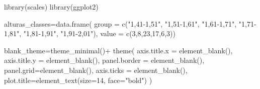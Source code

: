\documentclass[
]{book}
\newenvironment{Shaded}{\begin{snugshade}}{\end{snugshade}}
\newcommand{\AttributeTok}[1]{\textcolor[rgb]{0.77,0.63,0.00}{#1}}
\newcommand{\DecValTok}[1]{\textcolor[rgb]{0.00,0.00,0.81}{#1}}
\newcommand{\FunctionTok}[1]{\textcolor[rgb]{0.00,0.00,0.00}{#1}}
\newcommand{\NormalTok}[1]{#1}
\newcommand{\OtherTok}[1]{\textcolor[rgb]{0.56,0.35,0.01}{#1}}
\newcommand{\SpecialCharTok}[1]{\textcolor[rgb]{0.00,0.00,0.00}{#1}}
\newcommand{\StringTok}[1]{\textcolor[rgb]{0.31,0.60,0.02}{#1}}
\begin{document}
\begin{Shaded}
\begin{Highlighting}[]
\FunctionTok{library}\NormalTok{(scales)}
\FunctionTok{library}\NormalTok{(ggplot2)}

\NormalTok{alturas\_classes}\OtherTok{=}\FunctionTok{data.frame}\NormalTok{(}
  \AttributeTok{group =} \FunctionTok{c}\NormalTok{(}\StringTok{"1,41{-}1,51"}\NormalTok{,}
            \StringTok{"1,51{-}1,61"}\NormalTok{,}
            \StringTok{"1,61{-}1,71"}\NormalTok{,}
            \StringTok{"1,71{-}1,81"}\NormalTok{,}
            \StringTok{"1,81{-}1,91"}\NormalTok{,}
            \StringTok{"1,91{-}2,01"}\NormalTok{),}
  \AttributeTok{value =} \FunctionTok{c}\NormalTok{(}\DecValTok{3}\NormalTok{,}\DecValTok{8}\NormalTok{,}\DecValTok{23}\NormalTok{,}\DecValTok{17}\NormalTok{,}\DecValTok{6}\NormalTok{,}\DecValTok{3}\NormalTok{))}

\NormalTok{blank\_theme}\OtherTok{=}\FunctionTok{theme\_minimal}\NormalTok{()}\SpecialCharTok{+}
  \FunctionTok{theme}\NormalTok{(}
    \AttributeTok{axis.title.x =} \FunctionTok{element\_blank}\NormalTok{(),}
    \AttributeTok{axis.title.y =} \FunctionTok{element\_blank}\NormalTok{(),}
    \AttributeTok{panel.border =} \FunctionTok{element\_blank}\NormalTok{(),}
    \AttributeTok{panel.grid=}\FunctionTok{element\_blank}\NormalTok{(),}
    \AttributeTok{axis.ticks =} \FunctionTok{element\_blank}\NormalTok{(),}
    \AttributeTok{plot.title=}\FunctionTok{element\_text}\NormalTok{(}\AttributeTok{size=}\DecValTok{14}\NormalTok{, }\AttributeTok{face=}\StringTok{"bold"}\NormalTok{)}
\NormalTok{  )}


\end{Highlighting}
\end{Shaded}
\end{document}
